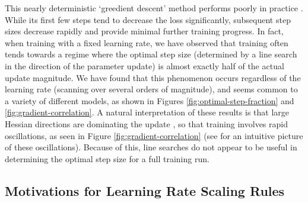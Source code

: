 \documentclass[english]{article}
\begin{document}
This nearly deterministic `greedient descent' method performs poorly in practice \cite{1803.02021}.  While its first few steps tend to decrease the loss significantly, subsequent step sizes decrease rapidly and provide minimal further training progress.  In fact, when training with a fixed learning rate, we have observed that training often tends towards a regime where the optimal step size (determined by a line search in the direction of the parameter update) is almost exactly half of the actual update magnitude.  We have found that this phenomenon occurs regardless of the learning rate (scanning over several orders of magnitude), and seems common to a variety of different models, as shown in Figures \ref{fig:optimal-step-fraction} and \ref{fig:gradient-correlation}.
A natural interpretation of these results is that large Hessian directions are dominating the update \cite{unpublished-grd}, so that training involves rapid oscillations, as seen in Figure \ref{fig:gradient-correlation} (see \cite{goh2017why} for an intuitive picture of these oscillations).  Because of this, line searches do not appear to be useful in determining the optimal step size for a full training run.



\subsection{Motivations for Learning Rate Scaling Rules}
\label{app:ScalingRuleMotivation}
\end{document}
